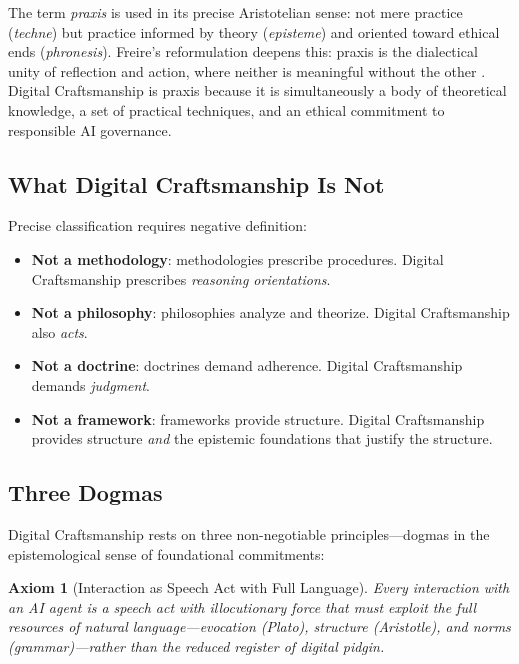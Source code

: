 \documentclass[12pt,a4paper]{article}
\newtheorem{axiom}{Axiom}[section]
\begin{document}
The term \emph{praxis} is used in its precise Aristotelian sense: not mere practice (\emph{techne}) but practice informed by theory (\emph{episteme}) and oriented toward ethical ends (\emph{phronesis}). Freire's reformulation deepens this: praxis is the dialectical unity of reflection and action, where neither is meaningful without the other \cite{freire1970}. Digital Craftsmanship is praxis because it is simultaneously a body of theoretical knowledge, a set of practical techniques, and an ethical commitment to responsible AI governance.

\subsection{What Digital Craftsmanship Is Not}

Precise classification requires negative definition:

\begin{itemize}
  \item \textbf{Not a methodology}: methodologies prescribe procedures. Digital Craftsmanship prescribes \emph{reasoning orientations}.
  \item \textbf{Not a philosophy}: philosophies analyze and theorize. Digital Craftsmanship also \emph{acts}.
  \item \textbf{Not a doctrine}: doctrines demand adherence. Digital Craftsmanship demands \emph{judgment}.
  \item \textbf{Not a framework}: frameworks provide structure. Digital Craftsmanship provides structure \emph{and} the epistemic foundations that justify the structure.
\end{itemize}

\subsection{Three Dogmas}

Digital Craftsmanship rests on three non-negotiable principles---dogmas in the epistemological sense of foundational commitments:

\begin{axiom}[Interaction as Speech Act with Full Language]
Every interaction with an AI agent is a speech act with illocutionary force that must exploit the full resources of natural language---evocation (Plato), structure (Aristotle), and norms (grammar)---rather than the reduced register of digital pidgin.
\end{axiom}
\end{document}
